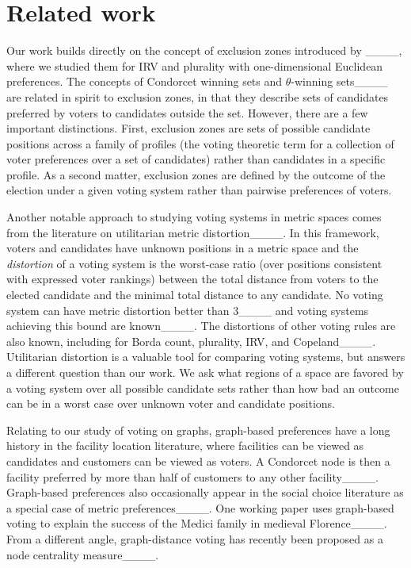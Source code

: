 \section{Related work}
Our work builds directly on the concept of exclusion zones introduced by ____, where we studied them for IRV and plurality with one-dimensional Euclidean preferences. The concepts of Condorcet winning sets and $\theta$-winning sets____ are related in spirit to exclusion zones, in that they describe sets of candidates preferred by voters to candidates outside the set. However, there are a few important distinctions. First, exclusion zones are sets of possible candidate positions across a family of profiles (the voting theoretic term for a collection of voter preferences over a set of candidates) rather than candidates in a specific profile. As a second matter, exclusion zones are defined by the outcome of the election under a given voting system rather than pairwise preferences of voters.

Another notable approach to studying voting systems in metric spaces comes from the literature on utilitarian metric distortion____. In this framework, voters and candidates have unknown positions in a metric space and the \emph{distortion} of a voting system is the worst-case ratio (over positions consistent with expressed voter rankings) between the total distance from voters to the elected candidate and the minimal total distance to any candidate. No voting system can have metric distortion better than 3____ and voting systems achieving this bound are known____. The distortions of other voting rules are also known, including for Borda count, plurality, IRV, and Copeland____. Utilitarian distortion is a valuable tool for comparing voting systems, but answers a different question than our work. We ask what regions of a space are favored by a voting system over all possible candidate sets rather than how bad an outcome can be in a worst case over unknown voter and candidate positions.  

Relating to our study of voting on graphs, graph-based preferences have a long history in the facility location literature, where facilities can be viewed as candidates and customers can be viewed as voters. A Condorcet node is then a facility preferred by more than half of customers to any other facility____. Graph-based preferences also occasionally appear in the social choice literature as a special case of metric preferences____. One working paper uses graph-based voting to explain the success of the Medici family in medieval Florence____. From a different angle, graph-distance voting has recently been proposed as a node centrality measure____.